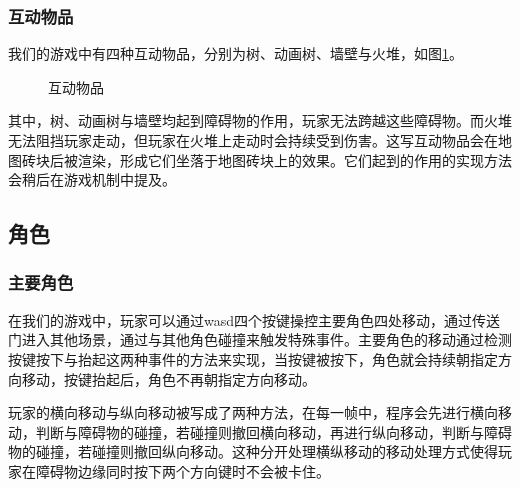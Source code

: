 \documentclass{ctexart}
\begin{document}
\subsubsection{互动物品}
我们的游戏中有四种互动物品，分别为树、动画树、墙壁与火堆，如图\ref{fig:互动物品}。
\begin{figure}[h]
\centering
{}
\caption{\label{fig:互动物品}互动物品}
\end{figure}

其中，树、动画树与墙壁均起到障碍物的作用，玩家无法跨越这些障碍物。而火堆无法阻挡玩家走动，但玩家在火堆上走动时会持续受到伤害。这写互动物品会在地图砖块后被渲染，形成它们坐落于地图砖块上的效果。它们起到的作用的实现方法会稍后在游戏机制中提及。

\subsection{角色}
\subsubsection{主要角色}
在我们的游戏中，玩家可以通过wasd四个按键操控主要角色四处移动，通过传送门进入其他场景，通过与其他角色碰撞来触发特殊事件。主要角色的移动通过检测按键按下与抬起这两种事件的方法来实现，当按键被按下，角色就会持续朝指定方向移动，按键抬起后，角色不再朝指定方向移动。

玩家的横向移动与纵向移动被写成了两种方法，在每一帧中，程序会先进行横向移动，判断与障碍物的碰撞，若碰撞则撤回横向移动，再进行纵向移动，判断与障碍物的碰撞，若碰撞则撤回纵向移动。这种分开处理横纵移动的移动处理方式使得玩家在障碍物边缘同时按下两个方向键时不会被卡住。
\end{document}
